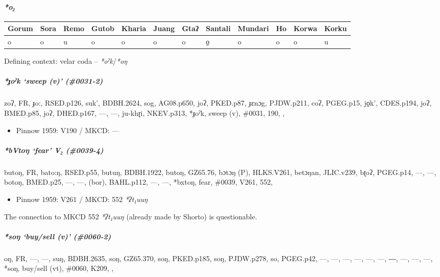 \documentclass[a4paper,]{article}
\providecommand{\tightlist}{%
  \setlength{\itemsep}{0pt}\setlength{\parskip}{0pt}}
\let\oldparagraph\paragraph
\renewcommand{\paragraph}[1]{\oldparagraph{#1}\mbox{}}
\let\oldsubparagraph\subparagraph
\renewcommand{\subparagraph}[1]{\oldsubparagraph{#1}\mbox{}}
\begin{document}
\paragraph{\texorpdfstring{\emph{*o₂}}{*o₂}}\label{o-1}

\begin{longtable}[]{@{}llllllllllll@{}}
\toprule
Gorum & Sora & Remo & Gutob & Kharia & Juang & Gtaʔ & Santali & Mundari
& Ho & Korwa & Korku\tabularnewline
\midrule
\endhead
o & o & u & o & o & o & o & o̠ & o & o & o & u\tabularnewline
\bottomrule
\end{longtable}

Defining context: velar coda -- \emph{*oˀk}/\emph{*oŋ}

\subparagraph{\texorpdfstring{\emph{*ɟoˀk} `sweep (v)'
(\#0031-2)}{*ɟoˀk sweep (v) (\#0031-2)}}\label{ux25foux2c0k-sweep-v-0031-2}

zoʔ, FR, ɟo:, RSED.p126, suk', BDBH.2624, sog, AG08.p650, joʔ, PKED.p87,
ɟɛnɔg, PJDW.p211, coʔ, PGEG.p15, jo̠k', CDES.p194, joʔ, BMED.p85, joʔ,
DHED.p167, ---, ---, ju-khɽi, NKEV.p313, *ɟoˀk, sweep (v), \#0031, 190,
,

\begin{itemize}
\tightlist
\item
  Pinnow 1959: V190 / MKCD: ---
\end{itemize}

\subparagraph{\texorpdfstring{\emph{*bVtoŋ} `fear' V₂
(\#0039-4)}{*bVtoŋ fear V₂ (\#0039-4)}}\label{bvtoux14b-fear-v-0039-4}

butoŋ, FR, bato:ŋ, RSED.p55, butuŋ, BDBH.1922, butoŋ, GZ65.76, bɔtɔŋ
(P), HLKS.V261, betɔŋan, JLIC.v239, bʈoʔ, PGEG.p14, ---, ---, botoŋ,
BMED.p25, ---, ---, (bor), BAHL.p112, ---, ---, *bxtoŋ, fear, \#0039,
V261, 552,

\begin{itemize}
\tightlist
\item
  Pinnow 1959: V261 / MKCD: 552 \emph{*ʔt₁uuŋ}
\end{itemize}

The connection to MKCD 552 \emph{*ʔt₁uuŋ} (already made by Shorto) is
questionable.

\subparagraph{\texorpdfstring{\emph{*soŋ} `buy/sell (v)'
(\#0060-2)}{*soŋ buy/sell (v) (\#0060-2)}}\label{soux14b-buysell-v-0060-2}

oŋ, FR, ---, ---, suŋ, BDBH.2635, soŋ, GZ65.370, soŋ, PKED.p185, soŋ,
PJDW.p278, so, PGEG.p42, ---, ---, ---, ---, ---, ---, ―, ---, ---, ---,
*soŋ, buy/sell (vt), \#0060, K209, ,
\end{document}
